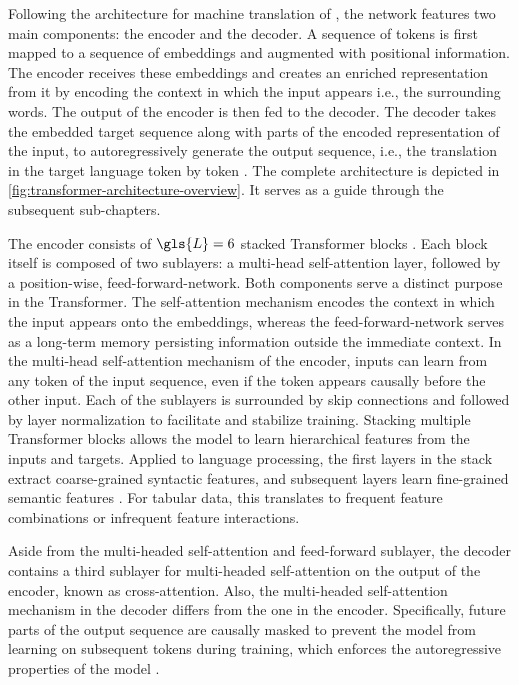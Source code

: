 Following the architecture for machine translation of \textcite[][3]{sutskeverSequenceSequenceLearning2014}, the network features two main components: the encoder and the decoder. A sequence of \glspl{token} is first mapped to a sequence of \glspl{embedding} and augmented with positional information. The encoder receives these \glspl{embedding} and creates an enriched representation from it by encoding the context in which the input appears i.e., the surrounding words. The output of the encoder is then fed to the decoder. The decoder takes the embedded target sequence along with parts of the encoded representation of the input, to autoregressively generate the output sequence, i.e., the translation in the target language \gls{token} by \gls{token} \autocite[][3]{vaswaniAttentionAllYou2017}. The complete architecture is depicted in \cref{fig:transformer-architecture-overview}. It serves as a guide through the subsequent sub-chapters.

The encoder consists of $\gls{L}=6$ stacked Transformer blocks \autocite[][6]{vaswaniAttentionAllYou2017}. Each block itself is composed of two sublayers: a multi-head self-attention layer, followed by a position-wise, \gls{feed-forward-network}. Both components serve a distinct purpose in the Transformer. The self-attention mechanism encodes the context in which the input appears onto the \glspl{embedding}, whereas the \gls{feed-forward-network} serves as a long-term memory persisting information outside the immediate context. In the multi-head self-attention mechanism of the encoder, inputs can learn from any \gls{token} of the input sequence, even if the \gls{token} appears causally before the other input. Each of the sublayers is surrounded by skip connections \autocite[][2]{heDeepResidualLearning2015} and followed by layer normalization \autocite[][4]{baLayerNormalization2016} to facilitate and stabilize training. Stacking multiple Transformer blocks allows the model to learn hierarchical features from the inputs and targets. Applied to language processing, the first layers in the stack extract coarse-grained syntactic features, and subsequent layers learn fine-grained semantic features \autocites[][3651]{jawaharWhatDoesBERT2019}[][4596]{tenneyBERTRediscoversClassical2019}. For tabular data, this translates to frequent feature combinations or infrequent feature interactions.

Aside from the multi-headed self-attention and feed-forward sublayer, the decoder contains a third sublayer for multi-headed self-attention on the output of the encoder, known as cross-attention. Also, the multi-headed self-attention mechanism in the decoder differs from the one in the encoder. Specifically, future parts of the output sequence are causally masked to prevent the model from learning on subsequent \glspl{token} during training, which enforces the autoregressive properties of the model \autocites[][3]{vaswaniAttentionAllYou2017}[][15]{narangTransformerModificationsTransfer2021}.

